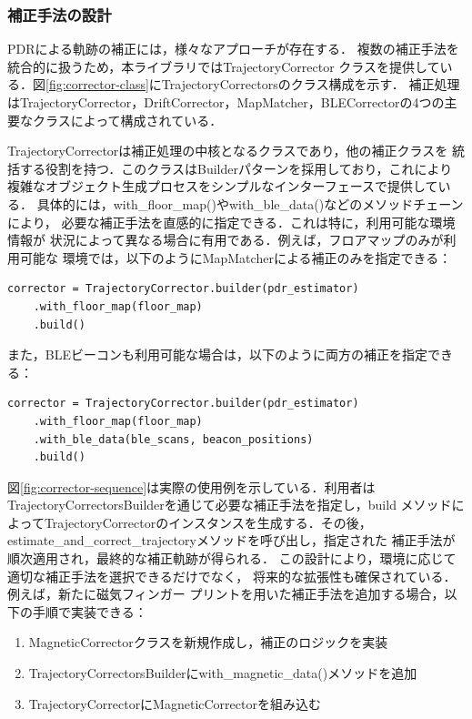 
\subsubsection{補正手法の設計}


PDRによる軌跡の補正には，様々なアプローチが存在する．
複数の補正手法を統合的に扱うため，本ライブラリではTrajectoryCorrector
クラスを提供している．図\ref{fig:corrector-class}にTrajectoryCorrectorsのクラス構成を示す．
補正処理はTrajectoryCorrector，DriftCorrector，MapMatcher，BLECorrectorの4つの主要なクラスによって構成されている．

TrajectoryCorrectorは補正処理の中核となるクラスであり，他の補正クラスを
統括する役割を持つ．このクラスはBuilderパターンを採用しており，これにより
複雑なオブジェクト生成プロセスをシンプルなインターフェースで提供している．
具体的には，with\_floor\_map()やwith\_ble\_data()などのメソッドチェーンにより，
必要な補正手法を直感的に指定できる．これは特に，利用可能な環境情報が
状況によって異なる場合に有用である．例えば，フロアマップのみが利用可能な
環境では，以下のようにMapMatcherによる補正のみを指定できる：

\begin{lstlisting}
corrector = TrajectoryCorrector.builder(pdr_estimator)
    .with_floor_map(floor_map)
    .build()
\end{lstlisting}

また，BLEビーコンも利用可能な場合は，以下のように両方の補正を指定できる：

\begin{lstlisting}
corrector = TrajectoryCorrector.builder(pdr_estimator)
    .with_floor_map(floor_map)
    .with_ble_data(ble_scans, beacon_positions)
    .build()
\end{lstlisting}


図\ref{fig:corrector-sequence}は実際の使用例を示している．利用者は
TrajectoryCorrectorsBuilderを通じて必要な補正手法を指定し，build
メソッドによってTrajectoryCorrectorのインスタンスを生成する．その後，
estimate\_and\_correct\_trajectoryメソッドを呼び出し，指定された
補正手法が順次適用され，最終的な補正軌跡が得られる．
この設計により，環境に応じて適切な補正手法を選択できるだけでなく，
将来的な拡張性も確保されている．例えば，新たに磁気フィンガー
プリントを用いた補正手法を追加する場合，以下の手順で実装できる：

\begin{enumerate}
  \item MagneticCorrectorクラスを新規作成し，補正のロジックを実装
  \item TrajectoryCorrectorsBuilderにwith\_magnetic\_data()メソッドを追加
  \item TrajectoryCorrectorにMagneticCorrectorを組み込む
\end{enumerate}




